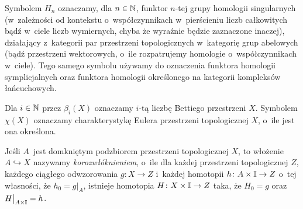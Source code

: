 Symbolem $H_n$ oznaczamy, dla $n\in\mathbb{N}$, funktor $n$-tej grupy homologii singularnych (w~zależności od kontekstu o~współczynnikach w~pierścieniu liczb całkowitych bądź w~ciele liczb wymiernych, chyba że wyraźnie będzie zaznaczone inaczej), działający z~kategorii par przestrzeni topologicznych w~kategorię grup abelowych (bądź przestrzeni wektorowych, o~ile rozpatrujemy homologie o~współczynnikach w~ciele). Tego samego symbolu używamy do oznaczenia funktora homologii symplicjalnych oraz funktora homologii określonego na kategorii kompleksów łańcuchowych. 

Dla $i\in \mathbb{N}$ przez $\beta_i(X)$ oznaczamy $i$-tą liczbę Bettiego przestrzeni $X$. Symbolem $\chi(X)$ oznaczamy charakterystykę Eulera przestrzeni topologicznej $X$, o~ile jest ona określona.

Jeśli $A$~jest domkniętym podzbiorem przestrzeni topologicznej $X$, to włożenie $A\hookrightarrow X$ nazywamy \textit{korozwłóknieniem}, o~ile dla każdej przestrzeni topologicznej $Z$, każdego ciągłego odwzorowania $g\colon X\to Z$ i~każdej homotopii $h\colon A\times \mathbb{I}\to Z$ o~tej własności, że $h_0=g\big|_A$, istnieje homotopia $H\colon X\times \mathbb{I}\to Z$ taka, że $H_0=g$ oraz $H\big|_{A\times \mathbb{I}}=h$.

